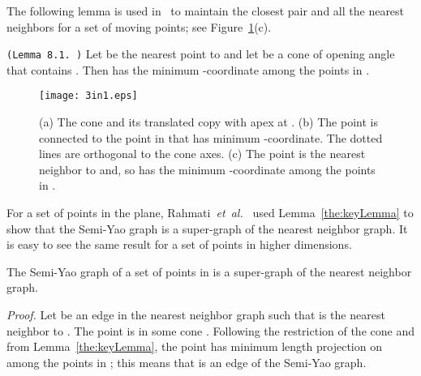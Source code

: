 \documentclass[11pt]{llncs}
\newcommand{\etal}{\emph{et~al.}}
\renewenvironment{proof}{\emph{Proof.}}{\hfill  \medskip\\}
\begin{document}
The following lemma is used in~\cite{Basch:1997:DSM:314161.314435,Agarwal:2008:KDD:1435375.1435379,socg17-rahmati} to maintain the closest pair and all the nearest neighbors for a set  of moving points; see Figure~\ref{fig:SY6}(c).
\begin{lemma}{\tt (Lemma 8.1.~\cite{Agarwal:2008:KDD:1435375.1435379})}\label{the:keyLemma}
Let  be the nearest point to  and let  be a cone of opening angle  that contains . Then  has the minimum -coordinate among the points in .
\end{lemma}
\begin{figure}[t]
\centering
\texttt{[image: 3in1.eps]}
\vspace{-5pt}
\caption{\small (a) The cone  and its translated copy with apex at . (b) The point  is connected to the point in  that has minimum -coordinate. The dotted lines are orthogonal to the cone axes. (c) The point  is the nearest neighbor to  and, so  has the minimum -coordinate among the points in .}
\vspace{-12pt}
\label{fig:SY6}
\end{figure}
For a set of points in the plane, Rahmati~\etal~\cite{socg17-rahmati} used Lemma~\ref{the:keyLemma} to show that the Semi-Yao graph is a super-graph of the nearest neighbor graph. It is easy to see the same result for a set of points in higher dimensions.
\begin{lemma}\label{the:SYcontainsNNG}
The Semi-Yao graph of a set of points in  is a super-graph of the nearest neighbor graph.
\end{lemma}
\begin{proof}
Let  be an edge in the nearest neighbor graph such that  is the nearest neighbor to . The point  is in some cone . Following the restriction  of the cone  and from Lemma~\ref{the:keyLemma}, the point  has minimum length projection on  among the points in ; this means that  is an edge of the Semi-Yao graph.
\end{proof}
\end{document}
